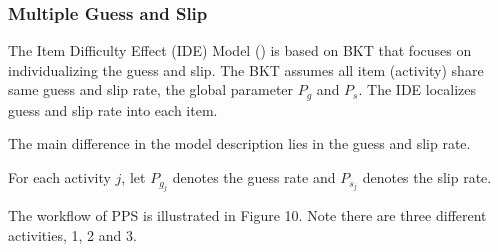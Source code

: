 \documentclass{article}
\begin{document}
\begin{center}
\end{center}


\subsubsection{Multiple Guess and Slip}

The Item Difficulty Effect (IDE) Model (\cite{multiguess}) is based on BKT that focuses on individualizing the guess and slip. The BKT assumes all item (activity) share same guess and slip rate, the global parameter \( P_g \) and \( P_s \). The IDE localizes guess and slip rate into each item.

The main difference in the model description lies in the guess and slip rate.

For each activity \( j \), let \( P_{g_j} \) denotes the guess rate and \( P_{s_j} \) denotes the slip rate.

The workflow of PPS is illustrated in Figure 10. Note there are three different activities, 1, 2 and 3.
\end{document}
